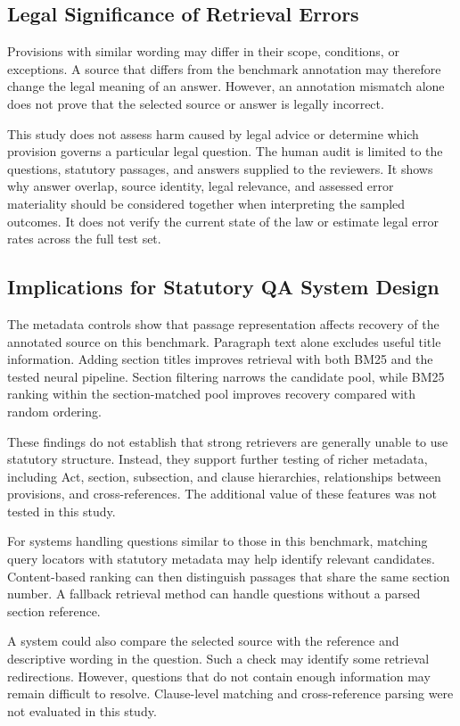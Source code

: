 \documentclass[pdflatex,sn-basic]{sn-jnl}%
\theoremstyle{thmstyleone}%
\theoremstyle{thmstyletwo}%
\theoremstyle{thmstylethree}%
\begin{document}
\subsection{Legal Significance of Retrieval Errors}

Provisions with similar wording may differ in their scope, conditions, or
exceptions. A source that differs from the benchmark annotation may therefore
change the legal meaning of an answer. However, an annotation mismatch alone
does not prove that the selected source or answer is legally incorrect.

This study does not assess harm caused by legal advice or determine which
provision governs a particular legal question. The human audit is limited to
the questions, statutory passages, and answers supplied to the reviewers. It
shows why answer overlap, source identity, legal relevance, and assessed error
materiality should be considered together when interpreting the sampled
outcomes. It does not verify the current state of the law or estimate legal
error rates across the full test set.

\subsection{Implications for Statutory QA System Design}

The metadata controls show that passage representation affects recovery of
the annotated source on this benchmark. Paragraph text alone excludes useful
title information. Adding section titles improves retrieval with both BM25
and the tested neural pipeline. Section filtering narrows the candidate pool,
while BM25 ranking within the section-matched pool improves recovery compared
with random ordering.

These findings do not establish that strong retrievers are generally unable
to use statutory structure. Instead, they support further testing of richer
metadata, including Act, section, subsection, and clause hierarchies,
relationships between provisions, and cross-references. The additional value
of these features was not tested in this study.

For systems handling questions similar to those in this benchmark, matching
query locators with statutory metadata may help identify relevant candidates.
Content-based ranking can then distinguish passages that share the same
section number. A fallback retrieval method can handle questions without a
parsed section reference.

A system could also compare the selected source with the reference and
descriptive wording in the question. Such a check may identify some retrieval
redirections. However, questions that do not contain enough information may
remain difficult to resolve. Clause-level matching and cross-reference parsing
were not evaluated in this study.
\end{document}
